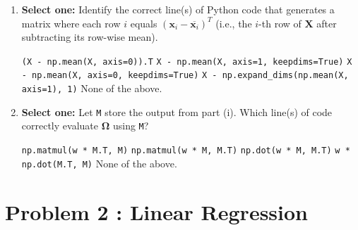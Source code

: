 \documentclass[11pt,addpoints,answers]{exam}
\newcommand{\xv}{\mathbf{x}}
\newcommand{\Xv}{\mathbf{X}}
\newcommand{\Omegav}{\boldsymbol{\Omega}}
\newcommand{\sone}{\textbf{Select one: }}
\begin{document}
\begin{enumerate}[label=\alph*), itemsep=10pt]
\begin{enumerate}[label=(\roman*), leftmargin=*]
			\item \sone Identify the correct line(s) of Python code that generates a matrix where each row $i$ equals $\left(\xv_i - \overline{\xv_i}\right)^T$ (i.e., the $i$-th row of $\Xv$ after subtracting its row-wise mean).
			
			{%
				\checkboxchar{$\Box$} \checkedchar{$\blacksquare$}
				\begin{checkboxes}
					\choice \texttt{(X - np.mean(X, axis=0)).T}
					\CorrectChoice \texttt{X - np.mean(X, axis=1, keepdims=True)}
					\choice \texttt{X - np.mean(X, axis=0, keepdims=True)}
					\choice \texttt{X - np.expand\_dims(np.mean(X, axis=1), 1)}
					\choice None of the above.
				\end{checkboxes}
			}
			
			
			\item \sone Let \texttt{M} store the output from part (i). Which line(s) of code correctly evaluate $\Omegav$ using \texttt{M}? \\
			
			{%
				\checkboxchar{$\Box$} \checkedchar{$\blacksquare$}
				\begin{samepage}
					\begin{checkboxes}
						\CorrectChoice \texttt{np.matmul(w * M.T, M)}
						\choice \texttt{np.matmul(w * M, M.T)}
						\choice \texttt{np.dot(w * M, M.T)}
						\choice \texttt{w * np.dot(M.T, M)}
						\choice None of the above.
					\end{checkboxes}
				\end{samepage}
			}
			
			
		\end{enumerate}
		
	\end{enumerate}
	\section*{Problem 2 : Linear Regression}
	
\end{document}
